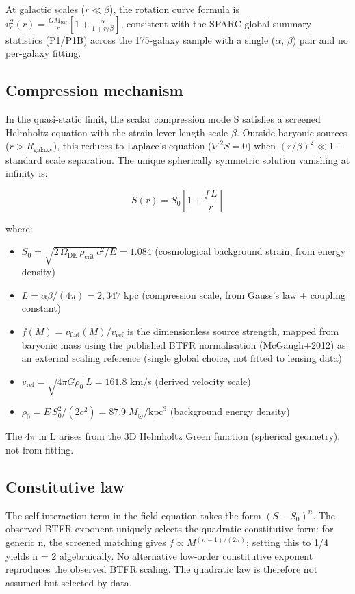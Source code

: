 \documentclass[11pt,a4paper]{article}
\begin{document}
At galactic scales (\(r \ll \beta\)), the rotation curve formula is \(v_c^2(r) = \frac{GM_{\mathrm{bar}}}{r}\left[1 + \frac{\alpha}{1 + r/\beta}\right]\), consistent with the SPARC global summary statistics (P1/\allowbreak{}P1B) across the 175-galaxy sample with a single ($\alpha$, $\beta$) pair and no per-galaxy fitting.

\subsection{Compression mechanism}
In the quasi-static limit, the scalar compression mode S satisfies a screened Helmholtz equation with the strain-lever length scale $\beta$. Outside baryonic sources (\(r > R_{\mathrm{galaxy}}\)), this reduces to Laplace's equation (\(\nabla^2 S = 0\)) when \((r/\beta)^2 \ll 1\)  -  standard scale separation. The unique spherically symmetric solution vanishing at infinity is:

\[ S(r) = S_0\left[1 + \frac{f\,L}{r}\right] \]

where:

\begin{itemize}
  \item \(S_0 = \sqrt{2\,\Omega_{\mathrm{DE}}\,\rho_{\mathrm{crit}}\,c^2 / E} = 1.084\) (cosmological background strain, from energy density)
  \item \(L = \alpha\beta / (4\pi) = 2{,}347\) kpc (compression scale, from Gauss's law + coupling constant)
  \item \(f(M) = v_{\mathrm{flat}}(M) / v_{\mathrm{ref}}\) is the dimensionless source strength, mapped from baryonic mass using the published BTFR normalisation (McGaugh+2012) as an external scaling reference (single global choice, not fitted to lensing data)
  \item \(v_{\mathrm{ref}} = \sqrt{4\pi G\rho_0}\,L = 161.8\) km/\allowbreak{}s (derived velocity scale)
  \item \(\rho_0 = E\,S_0^2 / (2c^2) = 87.9\;M_\odot/\mathrm{kpc}^3\) (background energy density)
\end{itemize}

The 4$\pi$ in L arises from the 3D Helmholtz Green function (spherical geometry), not from fitting.

\subsection{Constitutive law}
The self-interaction term in the field equation takes the form \((S - S_0)^n\). The observed BTFR exponent uniquely selects the quadratic constitutive form: for generic n, the screened matching gives \(f \propto M^{(n-1)/(2n)}\); setting this to 1/\allowbreak{}4 yields n = 2 algebraically. No alternative low-order constitutive exponent reproduces the observed BTFR scaling. The quadratic law is therefore not assumed but selected by data.
\end{document}
